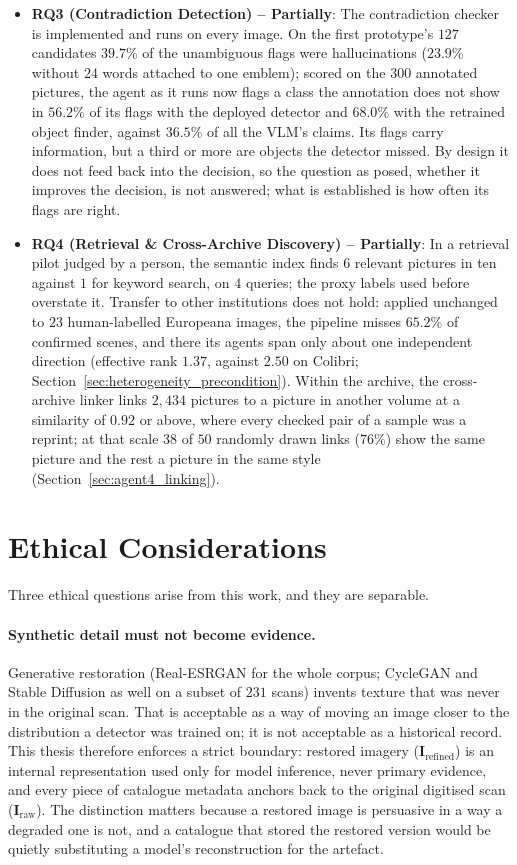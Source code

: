\documentclass[12pt,a4paper]{report}
\begin{document}
\begin{itemize}
    \item \textbf{RQ3 (Contradiction Detection) -- Partially}: The contradiction checker is implemented and runs on every image. On the first prototype's $127$ candidates $39.7\%$ of the unambiguous flags were hallucinations ($23.9\%$ without $24$ words attached to one emblem); scored on the $300$ annotated pictures, the agent as it runs now flags a class the annotation does not show in $56.2\%$ of its flags with the deployed detector and $68.0\%$ with the retrained object finder, against $36.5\%$ of all the VLM's claims. Its flags carry information, but a third or more are objects the detector missed. By design it does not feed back into the decision, so the question as posed, whether it improves the decision, is not answered; what is established is how often its flags are right.
    \item \textbf{RQ4 (Retrieval \& Cross-Archive Discovery) -- Partially}: In a retrieval pilot judged by a person, the semantic index finds $6$ relevant pictures in ten against $1$ for keyword search, on $4$ queries; the proxy labels used before overstate it. Transfer to other institutions does not hold: applied unchanged to $23$ human-labelled Europeana images, the pipeline misses $65.2\%$ of confirmed scenes, and there its agents span only about one independent direction (effective rank $1.37$, against $2.50$ on Colibri; Section~\ref{sec:heterogeneity_precondition}). Within the archive, the cross-archive linker links $2{,}434$ pictures to a picture in another volume at a similarity of $0.92$ or above, where every checked pair of a sample was a reprint; at that scale $38$ of $50$ randomly drawn links ($76\%$) show the same picture and the rest a picture in the same style (Section~\ref{sec:agent4_linking}).
\end{itemize}

\section{Ethical Considerations}
\label{sec:ethics}
Three ethical questions arise from this work, and they are separable.

\paragraph{Synthetic detail must not become evidence.} Generative restoration (Real-ESRGAN for the whole corpus; CycleGAN and Stable Diffusion as well on a subset of $231$ scans) invents texture that was never in the original scan. That is acceptable as a way of moving an image closer to the distribution a detector was trained on; it is not acceptable as a historical record. This thesis therefore enforces a strict boundary: restored imagery ($\mathbf{I}_{\text{refined}}$) is an internal representation used only for model inference, never primary evidence, and every piece of catalogue metadata anchors back to the original digitised scan ($\mathbf{I}_{\text{raw}}$). The distinction matters because a restored image is persuasive in a way a degraded one is not, and a catalogue that stored the restored version would be quietly substituting a model's reconstruction for the artefact.
\end{document}
